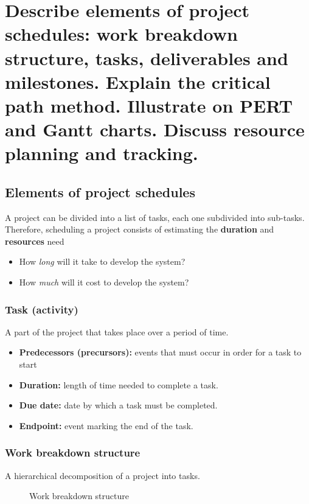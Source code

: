 \clearpage{}

\section{Describe elements of project schedules: work breakdown structure,
tasks, deliverables and milestones. Explain the critical path method.
Illustrate on PERT and Gantt charts. Discuss resource planning and
tracking.}

\subsection{Elements of project schedules}

A project can be divided into a list of tasks, each one subdivided into
sub-tasks. Therefore, scheduling a project consists of estimating the
\textbf{duration} and \textbf{resources} need

\begin{itemize}
	\item How \textit{long} will it take to develop the system?
	\item How \textit{much} will it cost to develop the system?
\end{itemize}

\subsubsection{Task (activity)}
A part of the project that takes place over a period of time.

\begin{itemize}
    \item \textbf{Predecessors (precursors):} events that must occur in order for a
    task to start
    \item \textbf{Duration:} length of time needed to complete a task.
    \item \textbf{Due date:} date by which a task must be completed.
    \item \textbf{Endpoint:} event marking the end of the task.
\end{itemize}

\subsubsection{Work breakdown structure}
A hierarchical decomposition of a project into tasks.
\begin{figure}[!ht]
    \centering
    
    \caption{Work breakdown structure}
\end{figure}



